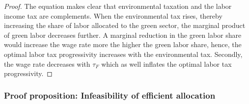 \begin{proof}
The equation makes clear that environmental taxation and the labor income tax are complements. When the environmental tax rises, thereby increasing the share of labor allocated to the green sector, the marginal product of green labor decreases further. A marginal reduction in the green labor share would increase the wage rate more the higher the green labor share, hence, the optimal labor tax progressivity increases with the environmental tax. 
Secondly, the wage rate decreases with $\tau_F$ which as well inflates the optimal labor tax progressivity. 
	\end{proof}

\subsubsection{Proof proposition: Infeasibility of efficient allocation}\label{app:ineff}
